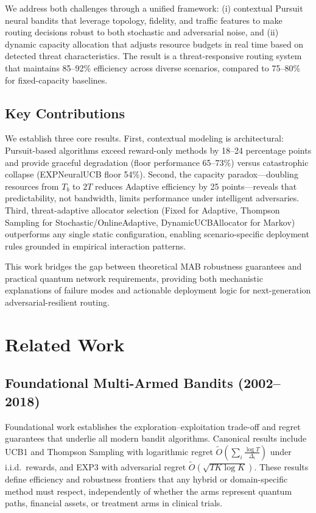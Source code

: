 \documentclass[11pt,a4paper]{article}
\begin{document}
We address both challenges through a unified framework: (i) contextual Pursuit neural bandits that leverage topology, fidelity, and traffic features to make routing decisions robust to both stochastic and adversarial noise, and (ii) dynamic capacity allocation that adjusts resource budgets in real time based on detected threat characteristics. The result is a threat-responsive routing system that maintains 85--92\% efficiency across diverse scenarios, compared to 75--80\% for fixed-capacity baselines.

\subsection{Key Contributions}

We establish three core results. First, contextual modeling is architectural: Pursuit-based algorithms exceed reward-only methods by 18--24 percentage points and provide graceful degradation (floor performance 65--73\%) versus catastrophic collapse (EXPNeuralUCB floor 54\%). Second, the capacity paradox—doubling resources from $T_b$ to $2T$ reduces Adaptive efficiency by 25 points—reveals that predictability, not bandwidth, limits performance under intelligent adversaries. Third, threat-adaptive allocator selection (Fixed for Adaptive, Thompson Sampling for Stochastic/OnlineAdaptive, DynamicUCBAllocator for Markov) outperforms any single static configuration, enabling scenario-specific deployment rules grounded in empirical interaction patterns.

This work bridges the gap between theoretical MAB robustness guarantees and practical quantum network requirements, providing both mechanistic explanations of failure modes and actionable deployment logic for next-generation adversarial-resilient routing.

\section{Related Work}
\label{sec:related_work}

\subsection{Foundational Multi-Armed Bandits (2002--2018)}

Foundational work establishes the exploration--exploitation trade-off and regret guarantees that underlie all modern bandit algorithms. Canonical results include UCB1 and Thompson Sampling with logarithmic regret $\tilde{O}\!\left(\sum_i \frac{\log T}{\Delta_i}\right)$ under i.i.d.\ rewards, and EXP3 with adversarial regret $\tilde{O}(\sqrt{T K \log K})$. These results define efficiency and robustness frontiers that any hybrid or domain-specific method must respect, independently of whether the arms represent quantum paths, financial assets, or treatment arms in clinical trials.
\end{document}
